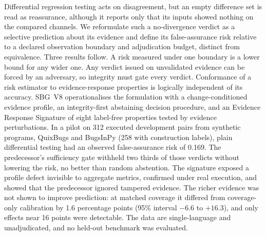 Differential regression testing acts on disagreement, but an empty difference set is read as reassurance, although it reports only that its inputs showed nothing on the compared channels. We reformulate such a no-divergence verdict as a selective prediction about its evidence and define its false-assurance risk relative to a declared observation boundary and adjudication budget, distinct from equivalence. Three results follow. A risk measured under one boundary is a lower bound for any wider one. Any verdict issued on unvalidated evidence can be forced by an adversary, so integrity must gate every verdict. Conformance of a risk estimator to evidence-response properties is logically independent of its accuracy. SBG~V8 operationalises the formulation with a change-conditioned evidence profile, an integrity-first abstaining decision procedure, and an Evidence Response Signature of eight label-free properties tested by evidence perturbations. In a pilot on 312 executed development pairs from synthetic programs, QuixBugs and BugsInPy (258 with construction labels), plain differential testing had an observed false-assurance risk of 0.169. The predecessor's sufficiency gate withheld two thirds of those verdicts without lowering the risk, no better than random abstention. The signature exposed a profile defect invisible to aggregate metrics, confirmed under real execution, and showed that the predecessor ignored tampered evidence. The richer evidence was not shown to improve prediction: at matched coverage it differed from coverage-only calibration by 1.6 percentage points (95\% interval $-6.6$ to $+16.3$), and only effects near 16 points were detectable. The data are single-language and unadjudicated, and no held-out benchmark was evaluated.
